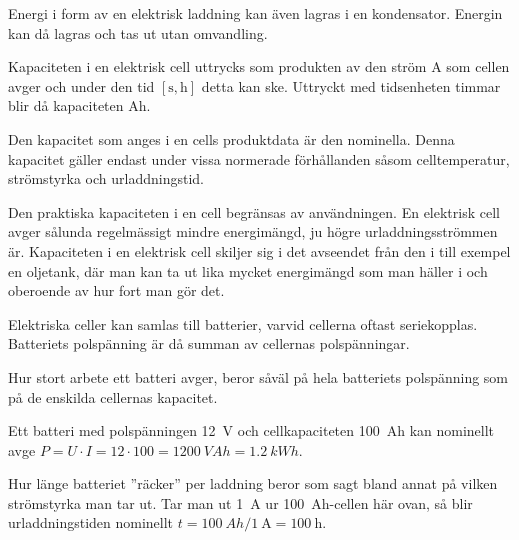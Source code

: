 Energi i form av en elektrisk laddning kan även lagras i en kondensator.
Energin kan då lagras och tas ut utan omvandling.

Kapaciteten i en elektrisk cell uttrycks som produkten av den ström \unit{\ampere}
som cellen avger och under den tid \(\mathrm{[s, h]}\) detta kan ske.
Uttryckt med tidsenheten timmar blir då kapaciteten \unit{Ah}.

Den kapacitet som anges i en cells produktdata är den nominella.
Denna kapacitet gäller endast under vissa normerade förhållanden såsom
celltemperatur, strömstyrka och urladdningstid.

Den praktiska kapaciteten i en cell begränsas av användningen.
En elektrisk cell avger sålunda regelmässigt mindre energimängd, ju högre
urladdningsströmmen är.
Kapaciteten i en elektrisk cell skiljer sig i det avseendet från den i till
exempel en oljetank, där man kan ta ut lika mycket energimängd som man häller i
och oberoende av hur fort man gör det.

Elektriska celler kan samlas till batterier, varvid cellerna oftast
seriekopplas.
Batteriets polspänning är då summan av cellernas pols\-pänningar.

Hur stort arbete ett batteri avger, beror såväl på hela batteriets
polspänning som på de enskilda cellernas kapacitet.

\begin{tcolorbox}[title=Exempel]
Ett batteri med polspänningen \qty{12}{\volt} och cellkapaciteten
\qty{100}{Ah} kan nominellt avge
\(P = U \cdot I = 12 \cdot 100 = \qty{1200}{VAh} = \qty{1,2}{kWh}\).
\end{tcolorbox}

Hur länge batteriet ''räcker'' per laddning beror som sagt bland annat på
vilken strömstyrka man tar ut.
Tar man ut \qty{1}{\ampere} ur \qty{100}{Ah}-cellen här ovan, så blir
urladdningstiden nominellt \(t = \qty{100}{Ah}/\qty{1}{\ampere} =
\qty{100}{\hour}\).
